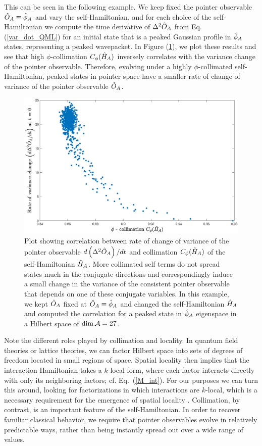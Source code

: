 \documentclass[aps,pra,onecolumn,nofootinbib,notitlepage,11pt,tightenlines]{revtex4-1}
\begin{document}
 This can be seen in the following example. We keep fixed the pointer observable $\hat{O}_{A} \equiv \hat{\phi}_{A}$ and vary the self-Hamiltonian, and for each choice of the self-Hamiltonian we compute the time derivative of $\Delta^2 \hat{O}_{A}$ from Eq. (\ref{var_dot_QML}) for an initial state that is a peaked Gaussian profile in $\hat{\phi}_{A}$ states, representing a peaked wavepacket.  In Figure (\ref{schwinger_vardot}), we plot these results and see that high $\phi$-collimation $C_{\phi}(\hat{H}_{A})$ inversely correlates with the variance change of the pointer observable. Therefore, evolving under a highly $\phi$-collimated self-Hamiltonian, peaked states in pointer space have a smaller rate of change of variance of the pointer observable $\hat{O}_{A}$.
\begin{figure}[h]
\includegraphics[width= \textwidth]{schwinger_vardot}
\caption{Plot showing correlation between rate of change of variance of the pointer observable $d \left(\Delta^{2} \hat{O}_{A}\right)/dt$ and collimation $C_{\phi}(\hat{H}_{A})$ of the self-Hamiltonian $\hat{H}_{A}$. More collimated self terms do not spread states much in the conjugate directions and correspondingly induce a small change in the variance of the consistent pointer observable that depends on one of these conjugate variables. In this example, we kept $\hat{O}_{A}$ fixed at $\hat{O}_{A} \equiv \hat{\phi}_{A}$ and changed the self-Hamiltonian $\hat{H}_{A}$ and computed the correlation for a peaked state in $\hat{\phi}_{A}$ eigenspace in a Hilbert space of $\textrm{dim\,} \mathcal{A} = 27$.}
\label{schwinger_vardot}
\end{figure}

Note the different roles played by collimation and locality. 
In quantum field theories or lattice theories, we can factor Hilbert space into sets of degrees of freedom located in small regions of space.
Spatial locality then implies that the interaction Hamiltonian takes a $k$-local form, where each factor interacts directly with only its neighboring factors; cf. Eq.~(\ref{M_int}).
For our purposes we can turn this around, looking for factorizations in which interactions are $k$-local, which is a necessary requirement for the emergence of spatial locality \cite{cotler2019locality}.
Collimation, by contrast, is an important feature of the self-Hamiltonian.
In order to recover familiar classical behavior, we require that pointer observables evolve in relatively predictable ways, rather than being instantly spread out over a wide range of values.
\end{document}
